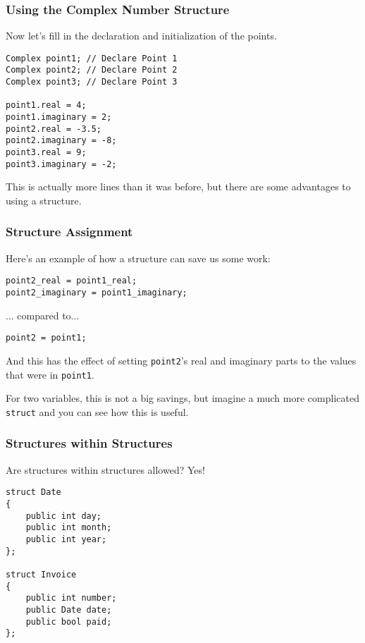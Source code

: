 \begin{frame}[fragile]
\frametitle{Using the Complex Number Structure}

Now let's fill in the declaration and initialization of the points.

\begin{verbatim}
Complex point1; // Declare Point 1
Complex point2; // Declare Point 2
Complex point3; // Declare Point 3

point1.real = 4;
point1.imaginary = 2;
point2.real = -3.5;
point2.imaginary = -8;
point3.real = 9;
point3.imaginary = -2;

\end{verbatim}

This is actually more lines than it was before, but there are some advantages to using a structure.

\end{frame}

\begin{frame}[fragile]
\frametitle{Structure Assignment}
Here's an example of how a structure can save us some work:

\begin{verbatim}
point2_real = point1_real;
point2_imaginary = point1_imaginary;
\end{verbatim}

... compared to...

\begin{verbatim}
point2 = point1;
\end{verbatim}

And this has the effect of setting \texttt{point2}'s real and imaginary parts to the values that were in \texttt{point1}.

For two variables, this is not a big savings, but imagine a much more complicated \texttt{struct} and you can see how this is useful.

\texttt{}

\end{frame}

\begin{frame}[fragile]
\frametitle{Structures within Structures}

Are structures within structures allowed? Yes!

\begin{verbatim}
struct Date
{
    public int day;
    public int month;
    public int year;
};

struct Invoice
{
    public int number;
    public Date date;
    public bool paid;
};
\end{verbatim}


\end{frame}

